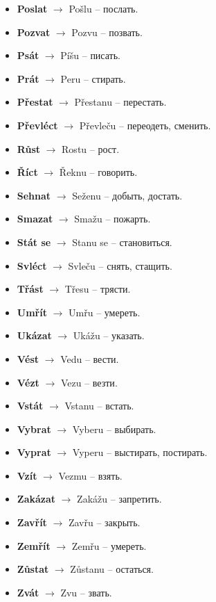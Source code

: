 \documentclass[12pt]{book}
\begin{document}
\begin{itemize}
    \item \textbf{Poslat} $\rightarrow$ Pošlu -- \textrussian{послать}.
    \item \textbf{Pozvat} $\rightarrow$ Pozvu -- \textrussian{позвать}.
    \item \textbf{Psát} $\rightarrow$ Píšu -- \textrussian{писать}.
    \item \textbf{Prát} $\rightarrow$ Peru -- \textrussian{стирать}.
    \item \textbf{Přestat} $\rightarrow$ Přestanu -- \textrussian{перестать}.
    \item \textbf{Převléct} $\rightarrow$ Převleču -- \textrussian{переодеть, сменить}.
    \item \textbf{Růst} $\rightarrow$ Rostu -- \textrussian{рост}.
    \item \textbf{Říct} $\rightarrow$ Řeknu -- \textrussian{говорить}.
    \item \textbf{Sehnat} $\rightarrow$ Seženu -- \textrussian{добыть, достать}.
    \item \textbf{Smazat} $\rightarrow$ Smažu -- \textrussian{пожарть}.
    \item \textbf{Stát se} $\rightarrow$ Stanu se -- \textrussian{становиться}.
    \item \textbf{Svléct} $\rightarrow$ Svleču -- \textrussian{снять, стащить}.
    \item \textbf{Třást} $\rightarrow$ Třesu -- \textrussian{трясти}.
    \item \textbf{Umřít} $\rightarrow$ Umřu -- \textrussian{умереть}.
    \item \textbf{Ukázat} $\rightarrow$ Ukážu -- \textrussian{указать}.
    \item \textbf{Vést} $\rightarrow$ Vedu -- \textrussian{вести}.
    \item \textbf{Vézt} $\rightarrow$ Vezu -- \textrussian{везти}.
    \item \textbf{Vstát} $\rightarrow$ Vstanu -- \textrussian{встать}.
    \item \textbf{Vybrat} $\rightarrow$ Vyberu -- \textrussian{выбирать}.
    \item \textbf{Vyprat} $\rightarrow$ Vyperu -- \textrussian{выстирать, постирать}.
    \item \textbf{Vzít} $\rightarrow$ Vezmu -- \textrussian{взять}.
    \item \textbf{Zakázat} $\rightarrow$ Zakážu -- \textrussian{запретить}.
    \item \textbf{Zavřít} $\rightarrow$ Zavřu -- \textrussian{закрыть}.
    \item \textbf{Zemřít} $\rightarrow$ Zemřu -- \textrussian{умереть}.
    \item \textbf{Zůstat} $\rightarrow$ Zůstanu -- \textrussian{остаться}.
    \item \textbf{Zvát} $\rightarrow$ Zvu -- \textrussian{звать}.
\end{itemize}
\end{document}
